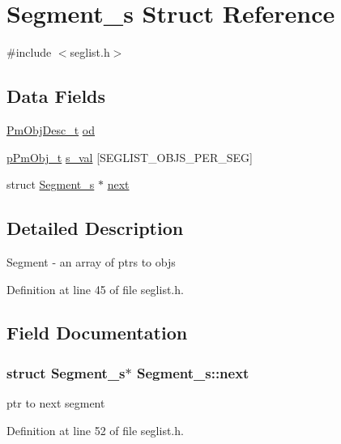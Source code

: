 \hypertarget{struct_segment__s}{\section{Segment\-\_\-s Struct Reference}
\label{struct_segment__s}
}


{\ttfamily \#include $<$seglist.\-h$>$}

\subsection*{Data Fields}
\begin{DoxyCompactItemize}
\item 
\hyperlink{obj_8h_a72d816790acd8eb550fb25268c2b3489}{Pm\-Obj\-Desc\-\_\-t} \hyperlink{struct_segment__s_a283161062c488c7c23a0a0e64bd1a274}{od}
\item 
\hyperlink{obj_8h_af293479fa3f9d92b941ee7445ad3960e}{p\-Pm\-Obj\-\_\-t} \hyperlink{struct_segment__s_ac87339f4439d877230b2c149f1c48e69}{s\-\_\-val} \mbox{[}S\-E\-G\-L\-I\-S\-T\-\_\-\-O\-B\-J\-S\-\_\-\-P\-E\-R\-\_\-\-S\-E\-G\mbox{]}
\item 
struct \hyperlink{struct_segment__s}{Segment\-\_\-s} $\ast$ \hyperlink{struct_segment__s_a670f375cecede059d36f64dc1966ae6e}{next}
\end{DoxyCompactItemize}


\subsection{Detailed Description}
Segment -\/ an array of ptrs to objs 

Definition at line 45 of file seglist.\-h.



\subsection{Field Documentation}
\hypertarget{struct_segment__s_a670f375cecede059d36f64dc1966ae6e}{
\subsubsection[{next}]{\setlength{\rightskip}{0pt plus 5cm}struct {\bf Segment\-\_\-s}$\ast$ Segment\-\_\-s\-::next}}\label{struct_segment__s_a670f375cecede059d36f64dc1966ae6e}
ptr to next segment 

Definition at line 52 of file seglist.\-h.

